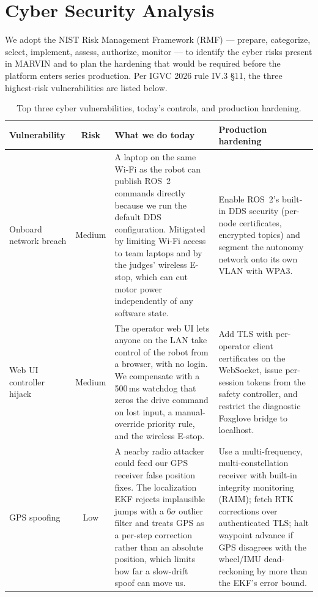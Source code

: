 \documentclass[12pt, letterpaper]{article}
\newcommand{\robotname}{MARVIN}
\begin{document}
\section{Cyber Security Analysis}
\label{sec:cyber}

We adopt the NIST Risk Management Framework (RMF) --- prepare, categorize, select,
implement, assess, authorize, monitor --- to identify the cyber risks present in
\robotname{} and to plan the hardening that would be required before the platform
enters series production. Per IGVC 2026 rule IV.3 \S11, the three highest-risk
vulnerabilities are listed below.

\begin{table}[H]
    \centering
    \footnotesize
    \caption{Top three cyber vulnerabilities, today's controls, and production hardening.}
    \label{tab:cyber}
    \begin{tabularx}{\textwidth}{l c X X}
        \toprule
        \textbf{Vulnerability} & \textbf{Risk} & \textbf{What we do today} & \textbf{Production hardening} \\
        \midrule
        Onboard network breach
        & Medium
        & A laptop on the same Wi-Fi as the robot can publish ROS~2 commands directly because we run the default DDS configuration. Mitigated by limiting Wi-Fi access to team laptops and by the judges' wireless E-stop, which can cut motor power independently of any software state.
        & Enable ROS~2's built-in DDS security (per-node certificates, encrypted topics) and segment the autonomy network onto its own VLAN with WPA3. \\
        \addlinespace
        Web UI controller hijack
        & Medium
        & The operator web UI lets anyone on the LAN take control of the robot from a browser, with no login. We compensate with a 500\,ms watchdog that zeros the drive command on lost input, a manual-override priority rule, and the wireless E-stop.
        & Add TLS with per-operator client certificates on the WebSocket, issue per-session tokens from the safety controller, and restrict the diagnostic Foxglove bridge to localhost. \\
        \addlinespace
        GPS spoofing
        & Low
        & A nearby radio attacker could feed our GPS receiver false position fixes. The localization EKF rejects implausible jumps with a 6$\sigma$ outlier filter and treats GPS as a per-step correction rather than an absolute position, which limits how far a slow-drift spoof can move us.
        & Use a multi-frequency, multi-constellation receiver with built-in integrity monitoring (RAIM); fetch RTK corrections over authenticated TLS; halt waypoint advance if GPS disagrees with the wheel/IMU dead-reckoning by more than the EKF's error bound. \\
        \bottomrule
    \end{tabularx}
\end{table}
\end{document}
